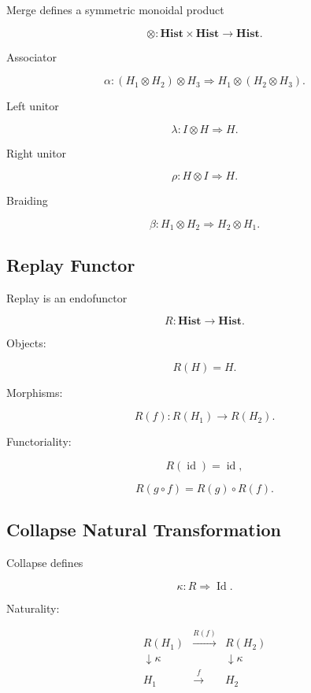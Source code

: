 \documentclass[12pt,oneside]{article}
\theoremstyle{definition}
\theoremstyle{remark}
\begin{document}
Merge defines a symmetric monoidal product

\[
\otimes
:
\mathbf{Hist}
\times
\mathbf{Hist}
\rightarrow
\mathbf{Hist}.
\]

Associator

\[
\alpha
:
(H_1\otimes H_2)\otimes H_3
\Rightarrow
H_1\otimes(H_2\otimes H_3).
\]

Left unitor

\[
\lambda
:
I\otimes H
\Rightarrow
H.
\]

Right unitor

\[
\rho
:
H\otimes I
\Rightarrow
H.
\]

Braiding

\[
\beta
:
H_1\otimes H_2
\Rightarrow
H_2\otimes H_1.
\]

\subsection*{Replay Functor}

Replay is an endofunctor

\[
R
:
\mathbf{Hist}
\rightarrow
\mathbf{Hist}.
\]

Objects:

\[
R(H)=H.
\]

Morphisms:

\[
R(f)
:
R(H_1)
\rightarrow
R(H_2).
\]

Functoriality:

\[
R(\operatorname{id})
=
\operatorname{id},
\]

\[
R(g\circ f)
=
R(g)\circ R(f).
\]

\subsection*{Collapse Natural Transformation}

Collapse defines

\[
\kappa
:
R
\Rightarrow
\operatorname{Id}.
\]

Naturality:

\[
\begin{array}{ccc}
R(H_1)
&
\xrightarrow{R(f)}
&
R(H_2)
\\
\downarrow\kappa
&&
\downarrow\kappa
\\
H_1
&
\xrightarrow{f}
&
H_2
\end{array}
\]
\end{document}
